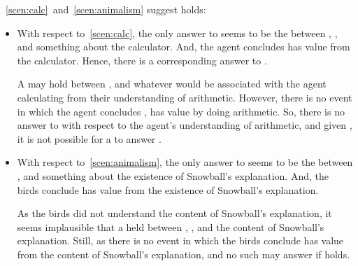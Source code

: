\begin{note}
  ~\ref{scen:calc}~and~\ref{scen:animalism} suggest \issueInclusion{} holds:
  \begin{itemize}[noitemsep]
  \item
    With respect to~\autoref{scen:calc}, the only answer to \qWhy{} seems to be the \ros{} between \propM{\gistCalcEq{}}, , and something about the calculator.
    And, the agent concludes \propM{\gistCalcEq{}} has value  from the calculator.
    Hence, there is a corresponding answer to \qHow{}.

    A \ros{} may hold between \propM{\gistCalcEq{}},  and whatever \pool{} would be associated with the agent calculating \gistCalcEq{} from their understanding of arithmetic.
    However, there is no event in which the agent concludes \propM{\gistCalcEq{}}, has value  by doing arithmetic.
    So, there is no answer to \qHow{} with respect to the agent's understanding of arithmetic, and given \issueInclusion{}, it is not possible for a \ros{} to answer \qWhy{}.
  \item
    With respect to~\autoref{scen:animalism}, the only answer to \qWhy{} seems to be the \ros{} between ,  and something about the existence of Snowball's explanation.
    And, the birds conclude  has value  from the existence of Snowball's explanation.

    As the birds did not understand the content of Snowball's explanation, it seems implausible that a \ros{} held between , , and the content of Snowball's explanation.
    Still, as there is no event in which the birds conclude  has value  from the content of Snowball's explanation, and no such \ros{} may answer \qWhy{} if \issueInclusion{} holds.
  \end{itemize}
\end{note}



